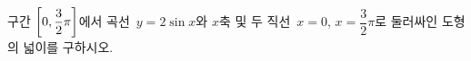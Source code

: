 \hspace*{2mm}\begin{minipage}[t]{\dimexpr\linewidth-2mm\relax}\vspace{0pt}
구간 $\left[0{,}\mkern3mu\mathopen{}\dfrac{3}{2}\pi\right]$에서 곡선~$y=2\sin x$와 $x$축 및 두 직선~$x=0$, $x=\dfrac{3}{2}\pi$로 둘러싸인 도형의 넓이를 구하시오.\end{minipage}
